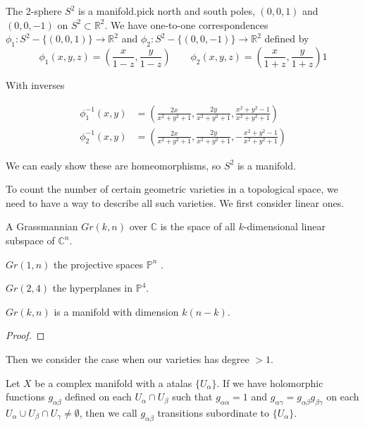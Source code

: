 \documentclass{article}
\begin{document}
\begin{eg}
    The 2-sphere $S^{2}$ is a manifold.pick north and south poles, $(0,0,1)$ 
    and $(0,0,-1)$ on $S^{2} \subset \mathbb{R}^{2}$. We have one-to-one correspondences
    $\phi_{1} : S^{2}- \{(0,0,1)\} \longrightarrow \mathbb{R}^{2} $ and 
    $\phi_{2} : S^{2}- \{(0,0,-1)\} \longrightarrow \mathbb{R}^{2}$ defined by\\
    
    \[
    \phi_{1}(x,y,z) = (\frac{x}{1-z},\frac{y}{1-z}) \qquad 
    \phi_{2}(x,y,z) = (\frac{x}{1+z},\frac{y}{1+z})1
    \]

    With inverses
    
    \begin{align*}
    \phi_{1}^{-1}(x,y) & = {}(\frac{2x}{x^{2}+y^{2}+1},\frac{2y}{x^{2}+y^{2}+1},\frac{x^{2}+y^{2}-1}{x^{2}+y^{2}+1}) \\
    \phi_{2}^{-1}(x,y) & = {}(\frac{2x}{x^{2}+y^{2}+1},\frac{2y}{x^{2}+y^{2}+1},-\frac{x^{2}+y^{2}-1}{x^{2}+y^{2}+1})
    \end{align*}
 
    We can easly show these are homeomorphisms, so $S^{2}$ is a manifold.
\end{eg}

To count the number of certain geometric varieties in a topological space, we need to have a way to describe 
all such varieties. We first consider linear ones.
\begin{df}
A Grassmannian $Gr(k,n)$ over $\mathbb{C}$ is the space of all $k$-dimensional 
linear subspace of $\mathbb{C}^{n}$. 
\end{df}

\begin{eg}
$Gr(1,n)$ the projective spaces $\mathbb{P}^{n}$ .
\end{eg}

\begin{eg}
$Gr(2,4)$ the hyperplanes in $\mathbb{P}^{4}$.
\end{eg}

\begin{thm}
$Gr(k,n)$ is a manifold with dimension $k(n-k) $. 
\end{thm}
\begin{proof}

\end{proof}
Then we consider the case when our varieties has degree $> 1$.

\begin{df}
    
\end{df}
\begin{df}
    Let $X$ be a complex manifold with a atalas $\{U_{\alpha}\}$. If we have holomorphic
    functions $g_{\alpha \beta}$ defined on each ${U_{\alpha}\cap U_{\beta}}$ such that 
    $g_{\alpha\alpha} = 1$ and $g_{\alpha \gamma} = g_{\alpha \beta} g_{\beta \gamma}$ 
    on  each $U_{\alpha}\cup U_{\beta}\cap U_{\gamma} \neq \emptyset$, then we call 
    ${g_{\alpha\beta}}$ transitions subordinate to $\{U_{\alpha}\}$.

\end{df}
\end{document}
